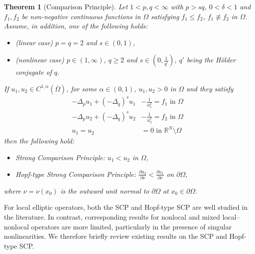 \documentclass[reqno,oneside]{amsart}
\newtheorem{theorem}{Theorem}[section]
\theoremstyle{definition}
\theoremstyle{remark}
\numberwithin{equation}{section}
\newcommand{\Om} {\Omega}
\newcommand{\p}{\Delta_p}
\newcommand{\qs}{(-\Delta_q)^s}
\newcommand{\bdry}{\mathbb{R}^N \setminus \Omega}
\newcommand{\pa}{\partial}
\begin{document}
\begin{theorem}[Comparison Principle]\label{Theorem_SCP}
    Let $1<p,q< \infty$ with $p>sq$, $0< \delta <1$ and $f_1,f_2$ be non-negative continuous functions in $\Om$ satisfying $f_1 \leq f_2$, $f_1 \not\equiv f_2$ in $\Om$. Assume, in addition, one of the following holds:
    \begin{itemize}
        \item[(i)] (linear case) $p=q=2$ and $s\in (0,1)$,
        \item[(ii)] (nonlinear case) $p\in (1,\infty)$, $q \geq 2$ and $s\in \left(0, \frac{1}{q'} \right)$, $q'$ being the H\"older conjugate of $q$.
    \end{itemize}
    If $u_1, u_2 \in C^{1,\alpha}(\overline{\Om})$, for some $\alpha\in(0,1)$, $u_1, u_2 >0$ in $\Om$ and they satisfy
    \begin{equation}\tag{$Q$}\label{scp equations}
        \begin{aligned}
            -\p u_1 + \qs u_1 &- \frac{1}{u_1^{\delta}} = f_1 \text{ in } \Om\\
            -\p u_2 + \qs u_2 &- \frac{1}{u_2^{\delta}} = f_2 \text{ in } \Om\\
            u_1 =u_2 &=0 \text{ in } \bdry
        \end{aligned}
    \end{equation}
    then the following hold:
    \begin{itemize}
        \item[(a)] Strong Comparison Principle: $u_1 < u_2$ in $\Om$,
        \item[(b)] Hopf-type Strong Comparison Principle: $\frac{\pa u_2}{\pa\nu} < \frac{\pa u_1}{\pa\nu}$ on $\pa\Om$,
    \end{itemize}
    where $\nu = \nu (x_0)$ is the outward unit normal to $\pa\Om$ at $x_0 \in \pa\Om$.
\end{theorem}

For local elliptic operators, both the SCP and Hopf-type SCP are well studied in the literature. In contrast, corresponding results for nonlocal and mixed local–nonlocal operators are more limited, particularly in the presence of singular nonlinearities. We therefore briefly review existing results on the SCP and Hopf-type SCP.
\end{document}
